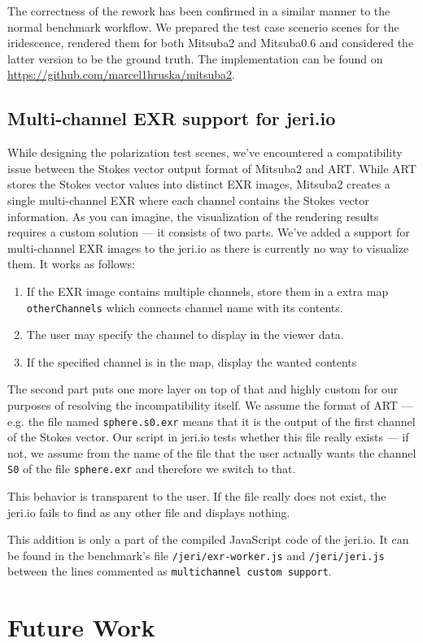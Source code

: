 The correctness of the rework has been confirmed in a similar manner to the normal benchmark workflow. We prepared the test case scenerio scenes for the iridescence, rendered them for both Mitsuba2 and Mitsuba0.6 and considered the latter version to be the ground truth. The implementation can be found on \url{https://github.com/marcel1hruska/mitsuba2}.

\subsection{Multi-channel EXR support for jeri.io}

While designing the polarization test scenes, we've encountered a compatibility issue between the Stokes vector output format of Mitsuba2 and ART. While ART stores the Stokes vector values into distinct EXR images, Mitsuba2 creates a single multi-channel EXR where each channel contains the Stokes vector information. As you can imagine, the visualization of the rendering results requires a custom solution --- it consists of two parts. We've added a support for multi-channel EXR images to the jeri.io as there is currently no way to visualize them. It works as follows:

\begin{enumerate}
	\item If the EXR image contains multiple channels, store them in a extra map \texttt{otherChannels} which connects channel name with its contents.
	\item The user may specify the channel to display in the viewer data.
	\item If the specified channel is in the map, display the wanted contents
\end{enumerate}

The second part puts one more layer on top of that and highly custom for our purposes of resolving the incompatibility itself. We assume the format of ART --- e.g. the file named \texttt{sphere.s0.exr} means that it is the output of the first channel of the Stokes vector. Our script in jeri.io tests whether this file really exists --- if not, we assume from the name of the file that the user actually wants the channel \texttt{S0} of the file \texttt{sphere.exr} and therefore we switch to that.

This behavior is transparent to the user. If the file really does not exist, the jeri.io fails to find as any other file and displays nothing.

This addition is only a part of the compiled JavaScript code of the jeri.io. It can be found in the benchmark's file \texttt{/jeri/exr-worker.js} and \texttt{/jeri/jeri.js} between the lines commented as \texttt{multichannel custom support}.

\section{Future Work}
